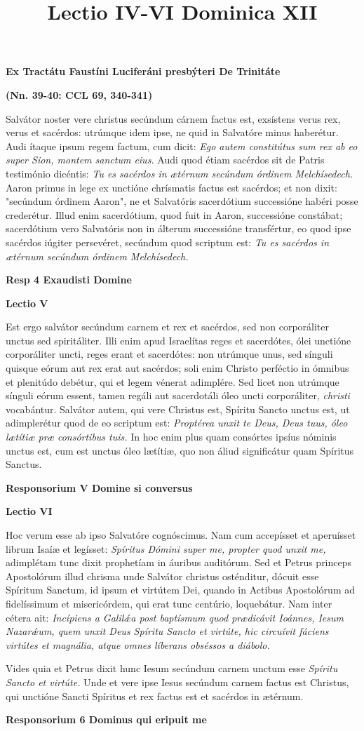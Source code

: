 \documentclass[options]{article}
\title{Lectio IV-VI Dominica XII}
\begin{document}
	\textbf{Ex Tractátu Faustíni Luciferáni presbýteri De Trinitáte}
	
\textbf{(Nn. 39-40: CCL 69, 340-341)}


	Salvátor noster vere christus secúndum cárnem factus est, exsístens verus rex, verus et sacérdos: utrúmque idem ipse, ne quid in Salvatóre minus haberétur. Audi ítaque ipsum regem factum, cum dicit: 
	\textit{Ego autem constitútus sum rex ab eo super Sion, montem sanctum eius.}
	Audi quod étiam sacérdos sit de Patris testimónio dicéntis: 
	\textit{Tu es sacérdos in ætérnum secúndum órdinem Melchísedech.}
	Aaron primus in lege ex unctióne chrísmatis factus est sacérdos; et non dixit: "secúndum órdinem Aaron", ne et Salvatóris sacerdótium successióne habéri posse crederétur. Illud enim sacerdótium, quod fuit in Aaron, successióne constábat; sacerdótium vero Salvatóris non in álterum successióne transfértur, eo quod ipse sacérdos iúgiter persevéret, secúndum quod scriptum est: 
	\textit{Tu es sacérdos in ætérnum secúndum órdinem Melchísedech.}
	

\textbf{Resp 4 Exaudisti Domine}
	

\textbf{Lectio V}


	Est ergo salvátor secúndum carnem et rex et sacérdos, sed non corporáliter unctus sed spiritáliter. Illi enim apud Israelítas reges et sacerdótes, ólei unctióne corporáliter uncti, reges erant et sacerdótes: non utrúmque unus, sed sínguli quisque eórum aut rex erat aut sacérdos; soli enim Christo perféctio in ómnibus et plenitúdo debétur, qui et legem vénerat adimplére.
	Sed licet non utrúmque sínguli eórum essent, tamen regáli aut sacerdotáli óleo uncti corporáliter,
	\textit{christi}
	vocabántur. Salvátor autem, qui vere Christus est, Spíritu Sancto unctus est, ut adimplerétur quod de eo scriptum est: 
	\textit{Proptérea unxit te Deus, Deus tuus, óleo lætítiæ præ consórtibus tuis.}
	In hoc enim plus quam consórtes ipsíus nóminis unctus est, cum est unctus óleo lætítiæ, quo non áliud significátur quam Spíritus Sanctus.
	
	
	\textbf{Responsorium V    Domine si conversus}
	
	\textbf{Lectio VI}
	
	Hoc verum esse ab ipso Salvatóre cognóscimus. Nam cum accepísset et aperuísset librum Isaíæ et legísset: 
	\textit{Spíritus Dómini super me, propter quod unxit me,}
	adimplétam tunc dixit prophetíam in áuribus auditórum. Sed et Petrus princeps Apostolórum illud chrisma unde Salvátor christus osténditur, dócuit esse Spíritum Sanctum, id ipsum et virtútem Dei, quando in Actibus Apostolórum ad fidelíssimum et misericórdem, qui erat tunc centúrio, loquebátur. Nam inter cétera ait: 
	\textit{Incípiens a Galil\'{æ}a post baptísmum quod prædicávit Ioánnes, Iesum Nazar\'{æ}um, quem unxit Deus Spíritu Sancto et virtúte, hic circuívit fáciens virtútes et magnália, atque omnes líberans obséssos a diábolo.}
	
	Vides quia et Petrus dixit hunc Iesum secúndum carnem unctum esse 
	\textit{Spíritu Sancto et virtúte.}
	Unde et vere ipse Iesus secúndum carnem factus est Christus, qui unctióne Sancti Spíritus et rex factus est et sacérdos in ætérnum.
	
	
	\textbf{Responsorium 6 Dominus qui eripuit me}
	
\end{document}
